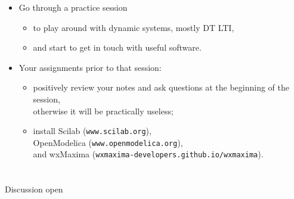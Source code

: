 \begin{frame}
\myPause
 \begin{itemize}[<+-| alert@+>]
 \item Go through a practice session
       \begin{itemize}[<+-| alert@+>]
       \item to play around with dynamic systems, mostly DT LTI,
       \item and start to get in touch with useful software.
       \end{itemize}
 \item \vfill Your assignments prior to that session:
       \begin{itemize}[<+-| alert@+>]
       \item positively review your notes and ask questions at the beginning of the session,\\
             otherwise it will be practically useless;
       \item install Scilab (\texttt{www.scilab.org}),\\
             OpenModelica (\texttt{www.openmodelica.org}),\\
             and wxMaxima (\texttt{wxmaxima-developers.github.io/wxmaxima}).
       \end{itemize}
 \end{itemize}
\end{frame}

\section{}
{
\begin{frame}[noframenumbering]
 \vspace{20mm}\Huge{Discussion open}
\end{frame}
}

